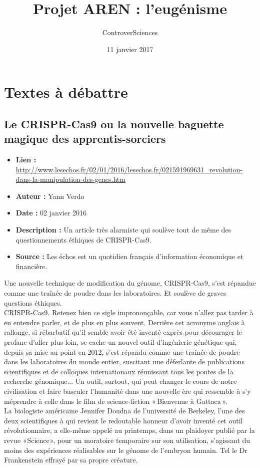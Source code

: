 \documentclass[8pt]{article}
\author{ControverSciences}
\title{Projet AREN : l'eugénisme}
\date{11 janvier 2017}
\begin{document}
\maketitle

\tableofcontents
\newpage
\section{Textes à débattre}
\subsection{Le CRISPR-Cas9 ou la nouvelle baguette magique des apprentis-sorciers}
\begin{itemize}
	\item \textbf{Lien : }  \url{http://www.lesechos.fr/02/01/2016/lesechos.fr/021591969631_revolution-dans-la-manipulation-des-genes.htm} 
	\item \textbf{Auteur : } Yann Verdo
	\item \textbf{Date : } 02 janvier 2016
	\item \textbf{Description : } Un article très alarmiste qui soulève tout de même des questionnements éthiques de CRISPR-Cas9.
	\item \textbf{Source : } Les échos est un quotidien français d'information économique et financière.
\end{itemize}


Une nouvelle technique de modification du génome, CRISPR-Cas9, s'est répandue comme une traînée de poudre dans les laboratoires. Et soulève de graves questions éthiques. \\

CRISPR-Cas9. Retenez bien ce sigle imprononçable, car vous n'allez pas tarder à en entendre parler, et de plus en plus souvent. Derrière cet acronyme anglais à rallonge, si rébarbatif qu'il semble avoir été inventé exprès pour décourager le profane d'aller plus loin, se cache un nouvel outil d'ingénierie génétique qui, depuis sa mise au point en 2012, s'est répandu comme une traînée de poudre dans les laboratoires du monde entier, suscitant une déferlante de publications scientifiques et de colloques internationaux réunissant tous les pontes de la recherche génomique... Un outil, ­surtout, qui peut changer le cours de notre civilisation et faire basculer l'humanité dans une nouvelle ère qui ressemble à s'y méprendre à celle dans le film de science-fiction « Bienvenue à Gattaca ». \\

La biologiste américaine Jennifer Doudna de l'université de Berkeley, l'une des deux scientifiques à qui revient le re­doutable honneur d'avoir inventé cet outil révolutionnaire, a elle-même appelé au printemps, dans un plaidoyer publié par la revue « Science », pour un moratoire temporaire sur son utilisation, s'agissant du moins des expériences réalisables sur le génome de l'embryon humain. Tel le Dr Franken­stein effrayé par sa propre créature. \\
\end{document}
